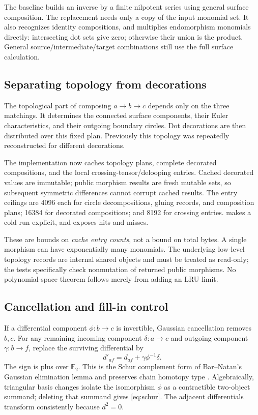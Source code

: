\documentclass[11pt,a4paper]{article}
\theoremstyle{definition}\newtheorem{remark}[theorem]{Remark}
\newcommand{\F}{\mathbb F_2}
\begin{document}
The baseline builds an inverse by a finite nilpotent series using general
surface composition. The replacement needs only a copy of the input monomial
set. It also recognizes identity compositions, and multiplies endomorphism
monomials directly: intersecting dot sets give zero; otherwise their union is
the product. General source/intermediate/target combinations still use the full
surface calculation.

\subsection{Separating topology from decorations}
The topological part of composing $a\to b\to c$ depends only on the three
matchings. It determines the connected surface components, their Euler
characteristics, and their outgoing boundary circles. Dot decorations are then
distributed over this fixed plan. Previously this topology was repeatedly
reconstructed for different decorations.

The implementation now caches topology plans, complete decorated compositions,
and the local crossing-tensor/delooping entries. Cached decorated values are
immutable; public morphism results are fresh mutable sets, so subsequent
symmetric differences cannot corrupt cached results. The entry ceilings are
4096 each for circle decompositions, gluing records, and composition plans;
16384 for decorated compositions; and 8192 for crossing entries.
 makes a cold run explicit, and  exposes
hits and misses.

These are bounds on \emph{cache entry counts}, not a bound on total bytes.
A single morphism can have exponentially many monomials. The underlying
low-level topology records are internal shared objects and must be treated as
read-only; the tests specifically check nonmutation of returned public morphisms.
No polynomial-space theorem follows merely from adding an LRU limit.

\subsection{Cancellation and fill-in control}
If a differential component $\phi:b\to c$ is invertible, Gaussian cancellation
removes $b,c$. For any remaining incoming component $\delta:a\to c$ and
outgoing component $\gamma:b\to f$, replace the surviving differential by
\begin{equation}
d'_{af}=d_{af}+\gamma\phi^{-1}\delta.
\label{eq:schur}
\end{equation}
The sign is plus over $\F$. This is the Schur complement form of
Bar--Natan's Gaussian elimination lemma and preserves chain homotopy type
\cite{BNfast}. Algebraically, triangular basis changes isolate the isomorphism
$\phi$ as a contractible two-object summand; deleting that summand gives
\eqref{eq:schur}. The adjacent differentials transform consistently because
$d^2=0$.
\end{document}
